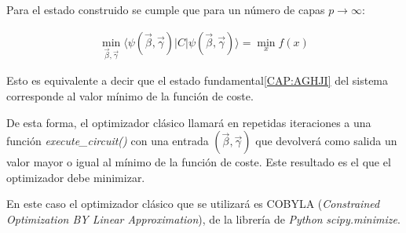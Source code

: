 Para el estado construido se cumple que para un número de capas $p \rightarrow \infty$:

\begin{align}
  \min_{\vec{\beta}, \vec{\gamma}} \langle \psi(\vec{\beta}, \vec{\gamma}) \rvert C \lvert \psi(\vec{\beta}, \vec{\gamma}) \rangle = \min_{x} f(x)
\end{align}

Esto es equivalente a decir que el estado fundamental\ref{CAP:AGHJI} del sistema corresponde al valor mínimo de la función de coste.

De esta forma, el optimizador clásico llamará en repetidas iteraciones a una función \textit{execute\_circuit()} con una entrada $(\vec{\beta}, \vec{\gamma})$ que devolverá como salida un valor mayor o igual al mínimo de la función de coste.
Este resultado es el que el optimizador debe minimizar.

En este caso el optimizador clásico que se utilizará es COBYLA (\textit{Constrained Optimization BY Linear Approximation}), de la librería de \textit{Python} \textit{scipy.minimize}.


